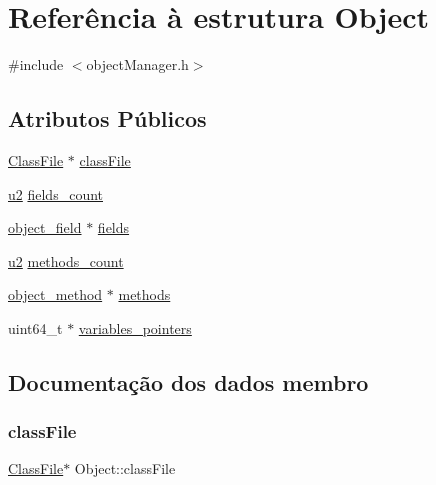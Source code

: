 \hypertarget{struct_object}{}\section{Referência à estrutura Object}
\label{struct_object}


{\ttfamily \#include $<$object\+Manager.\+h$>$}

\subsection*{Atributos Públicos}
\begin{DoxyCompactItemize}
\item 
\hyperlink{struct_class_file}{Class\+File} $\ast$ \hyperlink{struct_object_afd64a3d47458a977a78a3e8352bbadec}{class\+File}
\item 
\hyperlink{util_8h_a55ef8d87fd202b8417704c089899c5b9}{u2} \hyperlink{struct_object_ae49188b2c3ab5fedd541cbca086e8838}{fields\+\_\+count}
\item 
\hyperlink{structobject__field}{object\+\_\+field} $\ast$ \hyperlink{struct_object_a1c6bbd66c616ccb4a1a2bbfe47ec4a74}{fields}
\item 
\hyperlink{util_8h_a55ef8d87fd202b8417704c089899c5b9}{u2} \hyperlink{struct_object_a78202b9e7c0aed0bd10e1bb750a7e15a}{methods\+\_\+count}
\item 
\hyperlink{structobject__method}{object\+\_\+method} $\ast$ \hyperlink{struct_object_a6c4dcef68e549e6dbcb579f141abd781}{methods}
\item 
uint64\+\_\+t $\ast$ \hyperlink{struct_object_a9ea1c3bc8e1735168f9b9175931420e3}{variables\+\_\+pointers}
\end{DoxyCompactItemize}


\subsection{Documentação dos dados membro}
\mbox{\label{struct_object_afd64a3d47458a977a78a3e8352bbadec}} 
\subsubsection{\texorpdfstring{class\+File}{classFile}}
{\footnotesize\ttfamily \hyperlink{struct_class_file}{Class\+File}$\ast$ Object\+::class\+File}

\mbox{\label{struct_object_a1c6bbd66c616ccb4a1a2bbfe47ec4a74}} 
